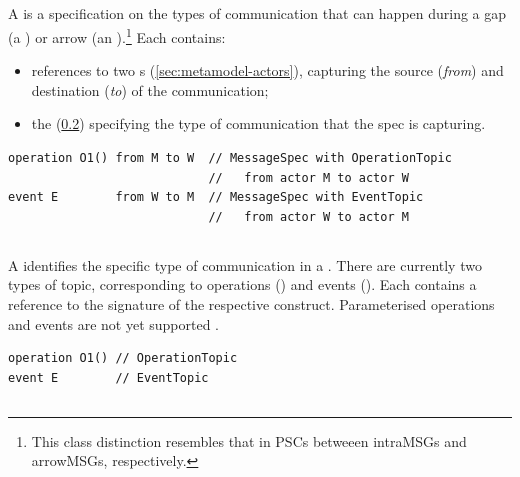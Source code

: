 \subsection{\mmessagespec}

A \mmessagespec{} is a specification on the types of communication that can
happen during a gap (a \mgapmessagespec) or arrow (an \marrowmessagespec).\footnote{
This class distinction resembles that in PSCs betweeen intraMSGs and arrowMSGs,
respectively.}  Each \mmessagespec{} contains:

\begin{itemize}
\item
	references to two \mactor s (\cref{sec:metamodel-actors}),
	capturing the source (\emph{from}) and destination (\emph{to})
	of the communication;
\item
	the \mmessagetopic{} (\cref{ssec:metamodel-messages-topics}) specifying
	the type of communication that the spec is capturing.
\end{itemize}

\begin{lstlisting}[style=Example]
operation O1() from M to W  // MessageSpec with OperationTopic
                            //   from actor M to actor W
event E        from W to M  // MessageSpec with EventTopic
                            //   from actor W to actor M
\end{lstlisting}

\subsection{\mmessagetopic}\label{ssec:metamodel-messages-topics}

A \mmessagetopic{} identifies the specific type of communication in a
\mmessagespec{}.  There are currently two types of topic, corresponding to
\robochart{} operations (\moperationtopic) and events (\meventtopic).
Each contains a reference to the signature of the respective construct.
Parameterised operations and events are not yet supported .

\begin{lstlisting}[style=Example]
operation O1() // OperationTopic
event E        // EventTopic
\end{lstlisting}

\subsection{\margument}\label{ssec:metamodel-messages-arguments}

